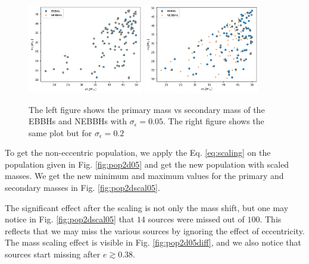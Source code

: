 \documentclass[twocolumn,prd,nofootinbib]{revtex4}
\begin{document}
\begin{figure}

\includegraphics[width=0.45\textwidth]{paper/figures/pop0.05.png}
\includegraphics[width=0.45\textwidth]{paper/figures/pop0.2.png}
\caption{\label{fig:pop_0.05_0.2} The left figure shows the primary mass vs secondary mass of the EBBHs and NEBBHs with $\sigma_\epsilon =0.05$. The right figure shows the same plot but for $\sigma_\epsilon=0.2$} 

\end{figure}




To get the non-eccentric population, we apply the Eq. \ref{eq:scaling} on the population given in Fig. \ref{fig:pop2d05} and get the new population with scaled masses. We get the new minimum and maximum values for the primary and secondary masses in Fig. \ref{fig:pop2dscal05}. 
   


The significant effect after the scaling is not only the mass shift, but one may notice in Fig. \ref{fig:pop2dscal05} that $14$ sources were missed out of $100$. This reflects that we may miss the various sources by ignoring the effect of eccentricity. The mass scaling effect is visible in Fig. \ref{fig:pop2d05diff}, and we also notice that sources start missing after $e \gtrsim 0.38$.
\end{document}
